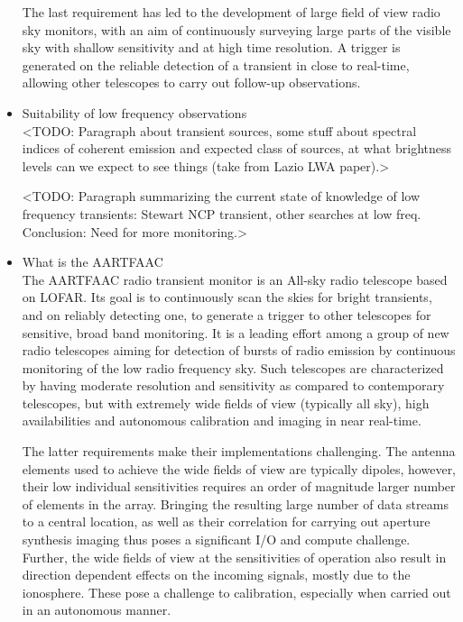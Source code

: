 \documentclass{aa}
\begin{document}
\begin{itemize}
The last requirement has led to the development of large field of view radio sky
monitors, with an  aim of continuously surveying large parts  of the visible sky
with shallow sensitivity and at high  time resolution. A trigger is generated on
the reliable  detection of  a transient  in close  to real-time,  allowing other
telescopes to carry out follow-up observations.

\item Suitability of low frequency observations \\
<TODO: Paragraph about  transient sources, some stuff about  spectral indices of
coherent emission and  expected class of sources, at what  brightness levels can
we expect to see things (take from Lazio LWA paper).>

<TODO: Paragraph  summarizing the  current state of  knowledge of  low frequency
transients: Stewart NCP transient, other  searches at low freq. Conclusion: Need
for more monitoring.>

\item What is the AARTFAAC \\
The AARTFAAC  radio transient  monitor is  an All-sky  radio telescope  based on
LOFAR. Its goal is to continuously scan  the skies for bright transients, and on
reliably detecting one, to generate a trigger to other telescopes for sensitive,
broad  band monitoring.   It is  a leading  effort among  a group  of new  radio
telescopes  aiming for  detection  of  bursts of  radio  emission by  continuous
monitoring of the low radio frequency sky.  Such telescopes are characterized by
having  moderate   resolution  and  sensitivity  as   compared  to  contemporary
telescopes, but  with extremely wide  fields of  view (typically all  sky), high
availabilities and autonomous calibration and imaging in near real-time.

The  latter requirements  make  their implementations  challenging. The  antenna
elements used to achieve the wide fields of view are typically dipoles, however,
their low individual sensitivities requires  an order of magnitude larger number
of elements in  the array.  Bringing the resulting large  number of data streams
to a  central location, as well  as their correlation for  carrying out aperture
synthesis imaging thus  poses a significant I/O and  compute challenge. Further,
the  wide fields  of  view at  the  sensitivities of  operation  also result  in
direction  dependent  effects  on  the  incoming  signals,  mostly  due  to  the
ionosphere. These pose  a challenge to calibration, especially  when carried out
in an autonomous manner.


\end{itemize}
\end{document}
